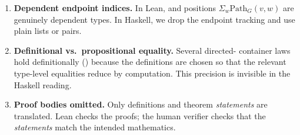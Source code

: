 \documentclass[11pt,a4paper]{article}
\begin{document}
\begin{enumerate}
\item \textbf{Dependent endpoint indices.}  In Lean,  and
  positions $\Sigma_{w} \mathrm{Path}_G(v, w)$ are genuinely dependent types.
  In Haskell, we drop the endpoint tracking and use plain lists or pairs.

\item \textbf{Definitional vs.\ propositional equality.}  Several directed-
  container laws hold definitionally () because the definitions are
  chosen so that the relevant type-level equalities reduce by computation.
  This precision is invisible in the Haskell reading.

\item \textbf{Proof bodies omitted.}  Only definitions and theorem
  \emph{statements} are translated.  Lean checks the proofs; the human
  verifier checks that the \emph{statements} match the intended mathematics.
\end{enumerate}
\end{document}
